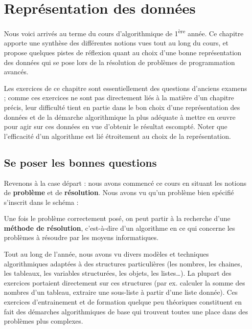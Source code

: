 \chapter{Représentation des données%
}

Nous voici arrivés au terme du cours d'algorithmique de
1\textsuperscript{ère} année. Ce chapitre apporte une synthèse des
différentes notions vues tout au long du cours, et propose quelques
pistes de réflexion quant au choix d’une bonne représentation des
données qui se pose lors de la résolution de problèmes de programmation
avancés.

Les exercices de ce chapitre sont essentiellement des questions
d’anciens examens ; comme ces exercices ne sont pas directement liés à
la matière d’un chapitre précis, leur difficulté tient en partie dans
le bon choix d’une représentation des données et de la démarche
algorithmique la plus adéquate à mettre en œuvre pour agir sur ces
données en vue d’obtenir le résultat escompté. Noter que l’efficacité
d’un algorithme est lié étroitement au choix de la représentation.

\section{Se poser les bonnes questions}

Revenons à la case départ : nous avons commencé ce cours en situant les
notions de \textbf{problème} et de \textbf{résolution}. Nous avons vu
qu’un problème bien spécifié s’inscrit dans le schéma :


Une fois le problème correctement posé, on peut partir à la recherche
d’une \textbf{méthode de résolution}, c’est-à-dire d’un algorithme en
ce qui concerne les problèmes à résoudre par les moyens informatiques.

Tout au long de l’année, nous avons vu divers modèles et techniques
algorithmiques adaptées à des structures particulières (les nombres,
les chaines, les tableaux, les variables structurées, les objets, les
listes\dots). La plupart des exercices portaient directement
sur ces structures (par ex. calculer la somme des nombres d’un tableau,
extraire une sous-liste à partir
d’une liste donnée). Ces exercices d’entrainement et de formation
quelque peu théoriques constituent en fait des démarches algorithmiques
de base qui trouvent toutes une place dans des problèmes plus
complexes.

